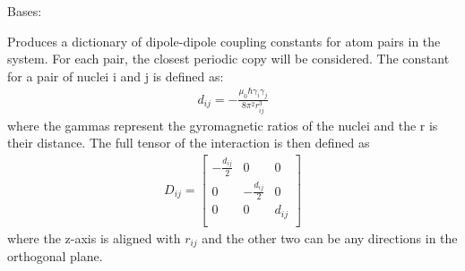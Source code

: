 \documentclass[letterpaper,10pt,english]{sphinxmanual}
\begin{document}
\begin{fulllineitems}
\label{doctree/soprano.properties.nmr.dipolar:soprano.properties.nmr.dipolar.DipolarCoupling}
Bases: {\hyperref[doctree/soprano.properties.atomsproperty:soprano.properties.atomsproperty.AtomsProperty]{}}

Produces a dictionary of dipole-dipole coupling constants for atom pairs
in the system. For each pair, the closest periodic copy will be considered.
The constant for a pair of nuclei i and j is defined as:
\begin{equation*}
\begin{split}d_{ij} = -\frac{\mu_0\hbar\gamma_i\gamma_j}{8\pi^2r_{ij}^3}\end{split}
\end{equation*}
where the gammas represent the gyromagnetic ratios of the nuclei and the
r is their distance. The full tensor of the interaction is then defined as
\begin{equation*}
\begin{split}D_{ij} = 
\begin{bmatrix}
 -\frac{d_{ij}}{2} & 0 & 0 \\
 0 & -\frac{d_{ij}}{2} & 0 \\
 0 & 0 & d_{ij} \\
\end{bmatrix}\end{split}
\end{equation*}
where the z-axis is aligned with \(r_{ij}\) and the other two can be any
directions in the orthogonal plane.


\end{fulllineitems}
\end{document}
